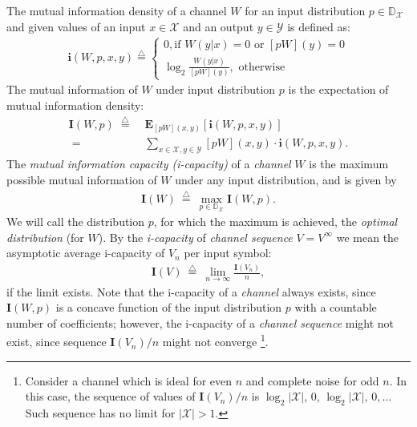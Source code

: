 \documentclass[journal, twocol]{IEEEtran}
\newcommand{\bD}{{\mathbb{D}}}
\newcommand{\bfE}{{\mathbf{E}}}
\newcommand{\bfI}{{\mathbf{I}}}
\newcommand{\mX}{{\mathcal{X}}}
\newcommand{\mY}{{\mathcal{Y}}}
\newcommand{\defeq}{{\overset{\triangle}{=}}}
\newcommand{\bi}{\mathbf{i}}
\newcommand{\pW}[2]{[{#1}{#2}]}
\newcommand{\pWd}[2]{[{#1}{#2}]}
\newcommand{\pWyd}[2]{[{#1}{#2}]}
\begin{document}
The mutual information density of a channel $W$ for an input distribution $p\in\bD_\mX$ and given values of an input $x\in\mX$ and an output $y\in\mY$ is defined as:
\begin{align}
\bi(W,p,x,y)\stackrel{\triangle}{=}
\begin{cases}	
	0, \text{if } W(y|x)=0 \text{ or } \pWyd{p}{W}(y)=0 \\	\log_2\displaystyle\frac{W(y|x)}{\pWyd{p}{W}(y)}, \text{ otherwise}
\end{cases}
\label{eq:IWpxy}
\end{align}
The mutual information of $W$ under input distribution $p$ is the expectation of mutual information density:
\begin{align}
\bfI(W,p)\;\defeq \; &
\bfE_{\pW{p}{W}(x,y)}[\bi(W,p,x,y)]
\nonumber\\
\;=\; &\sum_{x\in\mX,y\in\mY}\pWd{p}{W}(x,y)\cdot \bi(W,p,x,y).
\label{eq:IWp}
\end{align}
The \emph{mutual information capacity (i-capacity)} \cite{dobrushin59ageneral} of a \emph{channel} $W$ is the maximum possible mutual information of $W$ under any input distribution, and is given by%
\begin{align}
\bfI(W)\ \defeq\ \max_{p\in\bD_\mX}\bfI(W,p).
\label{eq:IWn}
\end{align}
We will call the distribution $p$, for which the maximum is achieved, the \emph{optimal distribution} (for $W$).
By the \emph{i-capacity} of \emph{channel sequence} $V=V^\infty$ we mean the asymptotic average i-capacity of $V_n$ per input symbol:
\begin{align}
\bfI(V)\ \defeq\ \lim_{n\to\infty}\frac{\bfI(V_n)}{n},
\label{eq:IW}
\end{align}
if the limit exists. Note that the i-capacity of a \emph{channel} always exists, since $\bfI(W,p)$ is a concave function of the input distribution $p$ with a countable number of coefficients; however, the i-capacity of a \emph{channel sequence} might not exist, since sequence $\bfI(V_n)/n$ might not converge%
\footnote{Consider a channel which is ideal for even $n$ and complete noise for odd $n$.
In this case, the sequence of values of $\bfI(V_n)/n$ is $\log_2|\mX|$, $0$, $\log_2|\mX|$, $0,\dots$
Such sequence has no limit for $|\mX|>1$.}.
\end{document}
